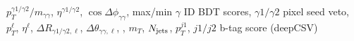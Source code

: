 $p_T^{\gamma 1/\gamma 2}/m_{\gamma\gamma}$, $\eta^{\gamma 1/\gamma 2}$, $\cos{\Delta\phi_{\gamma\gamma}}$, max/min $\gamma$ ID BDT scores, $\gamma 1/\gamma 2$ pixel seed veto, $p_T^\ell$, $\eta^\ell$, $\Delta R_{\gamma 1/\gamma 2,\ell}$, $\Delta\theta_{\gamma\gamma,\ell}$, \met, $m_T$, $N_{\rm{jets}}$, $p_T^{j1}$, $j1/j2$ b-tag score (deepCSV)